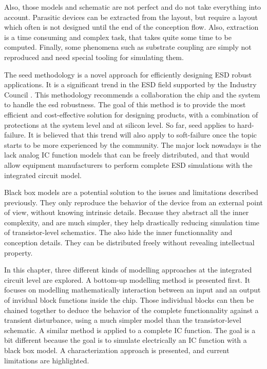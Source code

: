 Also, those models and schematic are not perfect and do not take everything into account.
Parasitic devices can be extracted from the layout, but require a layout which often is not designed until the end of the conception flow.
Also, extraction is a time consuming and complex task, that takes quite some time to be computed.
Finally, some phenomena such as substrate coupling are simply not reproduced and need special tooling for simulating them.

The \gls{seed} methodology is a novel approach for efficiently designing ESD robust applications.
It is a significant trend in the ESD field supported by the Industry Council \cite{seed}.
This methodology recommends a collaboration the chip and the system to handle the \gls{esd} robustness.
The goal of this method is to provide the most efficient and cost-effective solution for designing products, with a combination of protections at the system level and at silicon level.
So far, \gls{seed} applies to hard-failure.
It is believed that this trend will also apply to soft-failure once the topic starts to be more experienced by the community.
The major lock nowadays is the lack analog IC function models that can be freely distributed, and that would allow equipment manufacturers to perform complete ESD simulations with the integrated circuit model.

Black box models are a potential solution to the issues and limitations described previously.
They only reproduce the behavior of the device from an external point of view, without knowing intrinsic details.
Because they abstract all the inner complexity, and are much simpler, they help drastically reducing simulation time of transistor-level schematics.
The also hide the inner functionnality and conception details.
They can be distributed freely without revealing intellectual property.

In this chapter, three different kinds of modelling approaches at the integrated circuit level are explored.
A bottom-up modelling method is presented first.
It focuses on modelling mathematically interaction between an input and an output of invidual block functions inside the chip.
Those individual blocks can then be chained together to deduce the behavior of the complete functionnality against a transient disturbance, using a much simpler model than the transistor-level schematic.
A similar method is applied to a complete IC function.
The goal is a bit different because the goal is to simulate electrically an IC function with a black box model.
A characterization approach is presented, and current limitations are highlighted.
